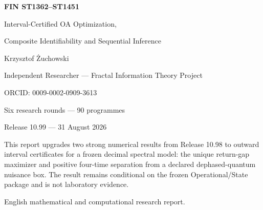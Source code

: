\documentclass[11pt,a4paper]{article}
\begin{document}
\begin{titlepage}\centering\vspace*{14mm}
{\Huge\bfseries FIN ST1362--ST1451\par}\vspace{4mm}
{\LARGE Interval-Certified OA Optimization,\par}\vspace{2mm}
{\LARGE Composite Identifiability and Sequential Inference\par}\vspace{12mm}
{\Large Krzysztof \.Zuchowski\par}
{\normalsize Independent Researcher --- Fractal Information Theory Project\par}
{\normalsize ORCID: 0009-0002-0909-3613\par}\vspace{9mm}
{\large Six research rounds --- 90 programmes\par}
{\large Release 10.99 --- 31 August 2026\par}
\vfill
\begin{minipage}{.87\textwidth}\small
This report upgrades two strong numerical results from Release 10.98 to
outward interval certificates for a frozen decimal spectral model: the unique
return-gap maximizer and positive four-time separation from a declared
dephased-quantum nuisance box.  The result remains conditional on the frozen
Operational/State package and is not laboratory evidence.
\end{minipage}\vfill
{\small English mathematical and computational research report.}
\end{titlepage}
\end{document}
